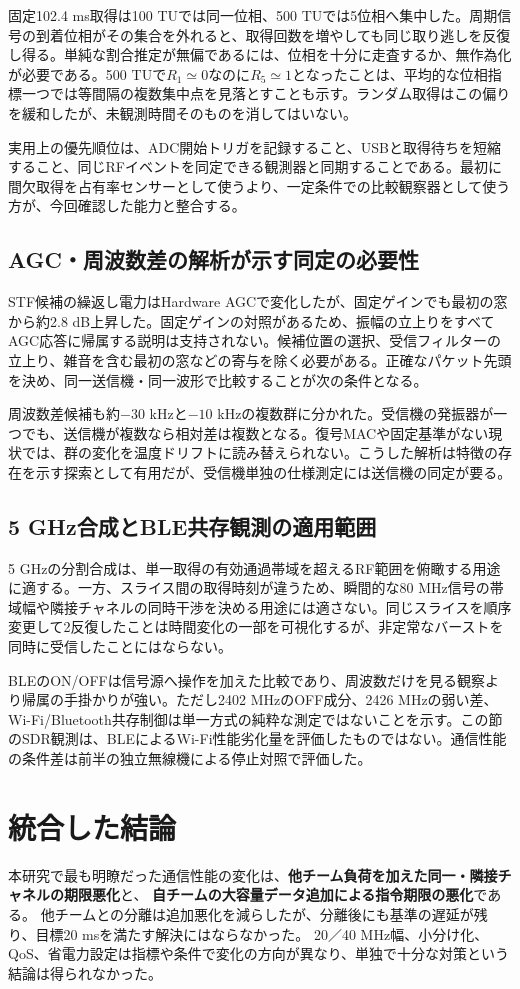 \documentclass[a4paper,10pt]{ltjsarticle}
\begin{document}
固定102.4 ms取得は100 TUでは同一位相、500 TUでは5位相へ集中した。周期信号の到着位相がその集合を外れると、取得回数を増やしても同じ取り逃しを反復し得る。単純な割合推定が無偏であるには、位相を十分に走査するか、無作為化が必要である。500 TUで$R_1\simeq0$なのに$R_5\simeq1$となったことは、平均的な位相指標一つでは等間隔の複数集中点を見落とすことも示す。ランダム取得はこの偏りを緩和したが、未観測時間そのものを消してはいない。

実用上の優先順位は、ADC開始トリガを記録すること、USBと取得待ちを短縮すること、同じRFイベントを同定できる観測器と同期することである。最初に間欠取得を占有率センサーとして使うより、一定条件での比較観察器として使う方が、今回確認した能力と整合する。

\subsection{AGC・周波数差の解析が示す同定の必要性}
STF候補の繰返し電力はHardware AGCで変化したが、固定ゲインでも最初の窓から約2.8 dB上昇した。固定ゲインの対照があるため、振幅の立上りをすべてAGC応答に帰属する説明は支持されない。候補位置の選択、受信フィルターの立上り、雑音を含む最初の窓などの寄与を除く必要がある。正確なパケット先頭を決め、同一送信機・同一波形で比較することが次の条件となる。

周波数差候補も約$-30$ kHzと$-10$ kHzの複数群に分かれた。受信機の発振器が一つでも、送信機が複数なら相対差は複数となる。復号MACや固定基準がない現状では、群の変化を温度ドリフトに読み替えられない。こうした解析は特徴の存在を示す探索として有用だが、受信機単独の仕様測定には送信機の同定が要る。

\subsection{5 GHz合成とBLE共存観測の適用範囲}
5 GHzの分割合成は、単一取得の有効通過帯域を超えるRF範囲を俯瞰する用途に適する。一方、スライス間の取得時刻が違うため、瞬間的な80 MHz信号の帯域幅や隣接チャネルの同時干渉を決める用途には適さない。同じスライスを順序変更して2反復したことは時間変化の一部を可視化するが、非定常なバーストを同時に受信したことにはならない。

BLEのON/OFFは信号源へ操作を加えた比較であり、周波数だけを見る観察より帰属の手掛かりが強い。ただし2402 MHzのOFF成分、2426 MHzの弱い差、Wi-Fi/Bluetooth共存制御は単一方式の純粋な測定ではないことを示す。この節のSDR観測は、BLEによるWi-Fi性能劣化量を評価したものではない。通信性能の条件差は前半の独立無線機による停止対照で評価した。

\section{統合した結論}
本研究で最も明瞭だった通信性能の変化は、\textbf{他チーム負荷を加えた同一・隣接チャネルの期限悪化}と、
\textbf{自チームの大容量データ追加による指令期限の悪化}である。
他チームとの分離は追加悪化を減らしたが、分離後にも基準の遅延が残り、目標20 msを満たす解決にはならなかった。
20／40 MHz幅、小分け化、QoS、省電力設定は指標や条件で変化の方向が異なり、単独で十分な対策という結論は得られなかった。
\end{document}
